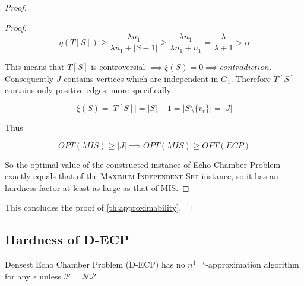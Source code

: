\begin{proof}
\begin{proof}
		\begin{equation}
			\eta(T[S]) \geq \frac{\lambda n_1}{\lambda n_1 + |S-1|} \geq \frac{\lambda n_1}{\lambda n_1 + n_1} = \frac{\lambda
			}{\lambda + 1} > \alpha
		\end{equation}

		This means that $T[S]$ is controversial $\implies \xi(S) = 0
			\implies contradiction$. Consequently $J$
		contains vertices which are independent in $G_1$. Therefore $T[S]$ contains
		only positive edges; more specifically

		\begin{equation}
			\xi(S) = |T[S]| = |S| - 1 = |S \setminus \{v_r\}| = |J|
		\end{equation}

		Thus

		\begin{equation}
			OPT(MIS) \geq |J| \implies OPT(MIS) \geq OPT(ECP)
		\end{equation}

		So the optimal value of the constructed instance of Echo Chamber Problem
		exactly equals that of the \textsc{Maximum Independent Set} instance, so it
		has an hardness factor at least as large as that of MIS.
	\end{proof}

	This concludes the proof of \autoref{th:approximability}.
\end{proof}

\subsection{Hardness of \acrshort{D-ECP}}%
\label{sub:d-ecp-hardness}

\begin{theorem}
	\label{th:approximability-densest}
	Densest Echo Chamber Problem (D-ECP) has no $n^{1-\epsilon} $-approximation algorithm for
	any $\epsilon$ unless $\mathcal{P} = \mathcal{NP}  $
\end{theorem}

